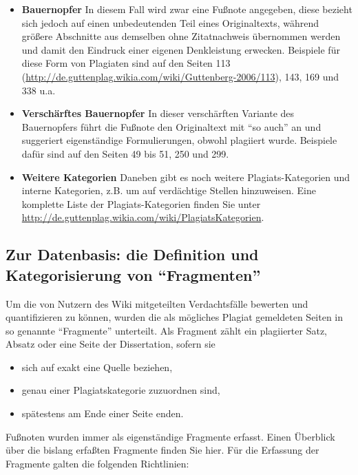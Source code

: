 \documentclass[ngerman,final,fontsize=12pt,paper=a4,twoside,BCOR=8mm,draft=false]{scrartcl}
\begin{document}
\begin{itemize}
\item \textbf{Bauernopfer} 
In diesem Fall wird zwar eine Fußnote angegeben, diese bezieht sich jedoch auf einen unbedeutenden Teil eines Originaltexts, während größere Abschnitte aus demselben ohne Zitatnachweis übernommen werden und damit den Eindruck einer eigenen Denkleistung erwecken. Beispiele für diese Form von Plagiaten sind auf den Seiten 113 (\url{http://de.guttenplag.wikia.com/wiki/Guttenberg-2006/113}), 143, 169 und 338 u.a.

\item \textbf{Verschärftes Bauernopfer} 
In dieser verschärften Variante des Bauernopfers führt die Fußnote den Originaltext mit "`so auch"' an und suggeriert eigenständige Formulierungen, obwohl plagiiert wurde. Beispiele dafür sind auf den Seiten 49 bis 51, 250 und 299.
\item \textbf{Weitere Kategorien} 
Daneben gibt es noch weitere Plagiats-Kategorien und interne Kategorien, z.B. um auf verdächtige Stellen hinzuweisen. Eine komplette Liste der Plagiats-Kategorien finden Sie unter \url{http://de.guttenplag.wikia.com/wiki/PlagiatsKategorien}.
\end{itemize}

\subsection{Zur Datenbasis: die Definition und Kategorisierung von "`Fragmenten"'}
Um die von Nutzern des Wiki mitgeteilten Verdachtsfälle bewerten und quantifizieren zu können, wurden die als mögliches Plagiat gemeldeten Seiten in so genannte "`Fragmente"' unterteilt. Als Fragment zählt ein plagiierter Satz, Absatz oder eine Seite der Dissertation, sofern sie

\begin{itemize}
\item sich auf exakt eine Quelle beziehen,
\item genau einer Plagiatskategorie zuzuordnen sind,
\item spätestens am Ende einer Seite enden.
\end{itemize}

Fußnoten wurden immer als eigenständige Fragmente erfasst. Einen
Überblick über die bislang erfaßten Fragmente finden Sie hier.  Für
die Erfassung der Fragmente galten die folgenden Richtlinien:
\end{document}
